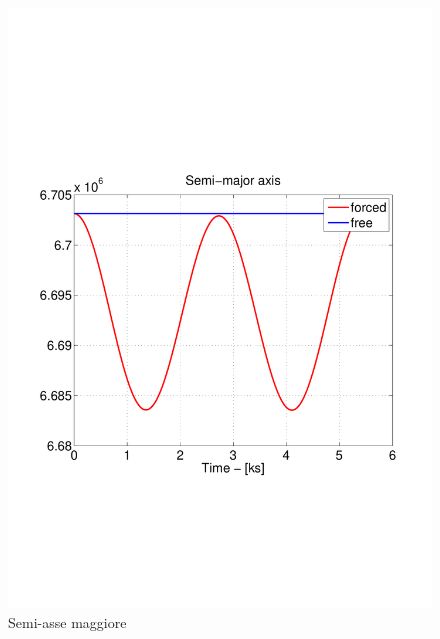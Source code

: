 \begin{figure}[h]
\begin{center}
  \includegraphics[width=\textwidth,clip=true,trim=1cm 6.5cm 1cm 8cm]
  {modelling/orbit_dynamics/image/semi-major_axis.pdf}
  \caption{Semi-asse maggiore}
\end{center}
\end{figure}

